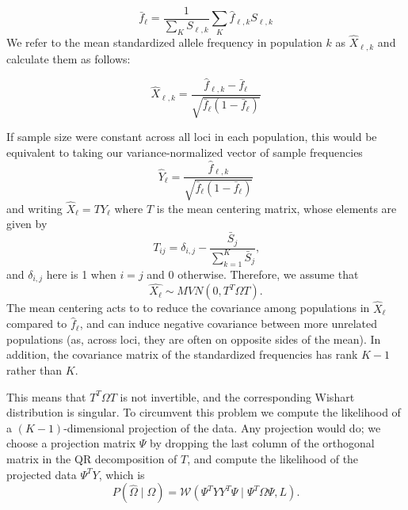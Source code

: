 \documentclass[12pt]{article}
\begin{document}
\begin{equation}
\label{eq:sample_mean_freq}
\bar{f}_{\ell} = \frac{1}{\sum_K S_{\ell,k}} \sum_K \hat{f}_{\ell,k} S_{\ell,k}
\end{equation}
We refer to the mean standardized allele frequency in population $k$ as $\hat{X}_{\ell,k}$ and calculate them as follows:

\begin{equation}
\hat{X}_{\ell,k} = \frac{ \hat{f}_{\ell,k} - \bar{f}_{\ell} } {\sqrt{\bar{f}_{\ell}(1-\bar{f}_{\ell})}}
\end{equation}

If sample size were constant across all loci in each population, this would be equivalent to taking our variance-normalized vector of sample frequencies
\begin{equation}
\hat{Y}_{\ell} = \frac{ \hat{f}_{\ell,k} } {\sqrt{\bar{f}_{\ell}(1-\bar{f}_{\ell})}}
\end{equation}
and writing $\hat{X}_{\ell} = T Y_{\ell} $ where $T$ is the mean centering matrix, whose elements are given by
\begin{equation}
T_{ij} = \delta_{i,j}  -  \frac{\bar{S}_j}{\sum\limits_{k=1}^{K} \bar{S}_j	} \text{,}
\end{equation}
and $\delta_{i,j}$ here is 1 when $i=j$ and 0 otherwise.
Therefore, we assume that
\begin{equation}
\hat{X_{\ell}} \sim MVN(0, T^T \Omega T) \text{.}
\end{equation}
The mean centering acts to to reduce the covariance among populations in $\hat{X}_{\ell}$ compared to $\hat{f}_{\ell}$, and can induce negative covariance between more unrelated populations (as, across loci, they are often on opposite sides of the mean). In addition, the covariance matrix of the standardized frequencies has rank $K-1$ rather than $K$.

This means that $T^T \Omega T$ is not invertible, and the corresponding Wishart distribution is singular.
To circumvent this problem we compute the likelihood of a $(K-1)$-dimensional projection of the data.
Any projection would do; we choose a projection matrix $\Psi$ by dropping the last column of the orthogonal matrix in the QR decomposition of $T$,
and compute the likelihood of the projected data $\Psi^T Y$, which is
\begin{equation} \label{eq:projected_wishart_dist}
P(\widehat{\Omega} \mid \Omega) = \mathcal{W}\left( \Psi^T YY^T \Psi \mid  \Psi^{T}   \Omega   \Psi,L \right) \text{.}
\end{equation}
\end{document}
